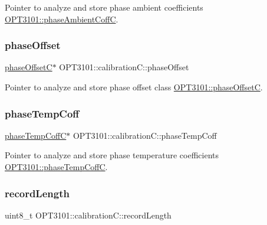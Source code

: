 Pointer to analyze and store phase ambient coefficients \mbox{\hyperlink{class_o_p_t3101_1_1phase_ambient_coff_c}{O\+P\+T3101\+::phase\+Ambient\+CoffC}}. 

\mbox{\label{class_o_p_t3101_1_1calibration_c_a06f6a097057b9ed8f4914f4027d709c1}} 
\subsubsection{\texorpdfstring{phase\+Offset}{phaseOffset}}
{\footnotesize\ttfamily \mbox{\hyperlink{class_o_p_t3101_1_1phase_offset_c}{phase\+OffsetC}}$\ast$ O\+P\+T3101\+::calibration\+C\+::phase\+Offset}



Pointer to analyze and store phase offset class \mbox{\hyperlink{class_o_p_t3101_1_1phase_offset_c}{O\+P\+T3101\+::phase\+OffsetC}}. 

\mbox{\label{class_o_p_t3101_1_1calibration_c_a277a7bbf506f5f5181719311d10bc610}} 
\subsubsection{\texorpdfstring{phase\+Temp\+Coff}{phaseTempCoff}}
{\footnotesize\ttfamily \mbox{\hyperlink{class_o_p_t3101_1_1phase_temp_coff_c}{phase\+Temp\+CoffC}}$\ast$ O\+P\+T3101\+::calibration\+C\+::phase\+Temp\+Coff}



Pointer to analyze and store phase temperature coefficients \mbox{\hyperlink{class_o_p_t3101_1_1phase_temp_coff_c}{O\+P\+T3101\+::phase\+Temp\+CoffC}}. 

\mbox{\label{class_o_p_t3101_1_1calibration_c_a8963999e75dd21df70925512905074c0}} 
\subsubsection{\texorpdfstring{record\+Length}{recordLength}}
{\footnotesize\ttfamily uint8\+\_\+t O\+P\+T3101\+::calibration\+C\+::record\+Length}



